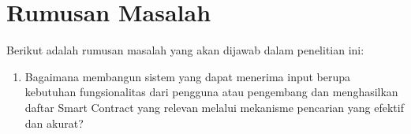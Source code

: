 \section{Rumusan Masalah}
\label{sec:rumusan-masalah}

Berikut adalah rumusan masalah yang akan dijawab dalam penelitian ini:
\begin{enumerate}
  

  \item Bagaimana membangun sistem yang dapat menerima input berupa kebutuhan fungsionalitas dari pengguna atau pengembang dan menghasilkan daftar Smart Contract yang relevan melalui mekanisme pencarian yang efektif dan akurat?


\end{enumerate}
